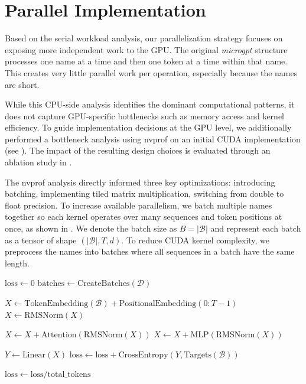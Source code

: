 \section{Parallel Implementation}

Based on the serial workload analysis, our parallelization strategy focuses on exposing more independent work to the GPU. The original \textit{microgpt} structure processes one name at a time and then one token at a time within that name. 
This creates very little parallel work per operation, especially because the names are short.

While this CPU-side analysis identifies the dominant computational patterns, it does not capture GPU-specific bottlenecks such as memory access and kernel efficiency. To guide implementation decisions at the GPU level, we additionally performed a bottleneck analysis using nvprof on an initial CUDA implementation (see ). The impact of the resulting design choices is evaluated through an ablation study in .

The nvprof analysis directly informed three key optimizations: introducing batching, implementing tiled matrix multiplication, switching from double to float precision. To increase available parallelism, we batch multiple names together so each kernel operates over many sequences and token positions at once, as shown in . 
We denote the batch size as $B = |\mathcal{B}|$ and represent each batch as a tensor of shape $(|\mathcal{B}|, T, d)$. To reduce CUDA kernel complexity, we preprocess the names into batches where all sequences in a batch have the same length.
\begin{algorithm}[H]
\caption{High-Level Batched Forward Pass}
\label{alg:batched}
\begin{algorithmic}
\State $\text{loss} \gets 0$
\State $\text{batches} \gets \text{CreateBatches}(\mathcal{D})$

    \State $X \gets \text{TokenEmbedding}(\mathcal{B}) + \text{PositionalEmbedding}(0{:}T-1)$
    \State $X \gets \text{RMSNorm}(X)$

        \State \textcolor{attncolor}{$X \gets X + \text{Attention}(\text{RMSNorm}(X))$} \textcolor{attncolor}{}
        \State \textcolor{mlpcolor}{$X \gets X + \text{MLP}(\text{RMSNorm}(X))$} 
    \EndFor

    \State $Y \gets \text{Linear}(X)$
    \State $\text{loss} \gets \text{loss} + \text{CrossEntropy}(Y, \text{Targets}(\mathcal{B}))$
\EndFor

\State $\text{loss} \gets \text{loss} / \text{total\_tokens}$
\end{algorithmic}
\end{algorithm}



